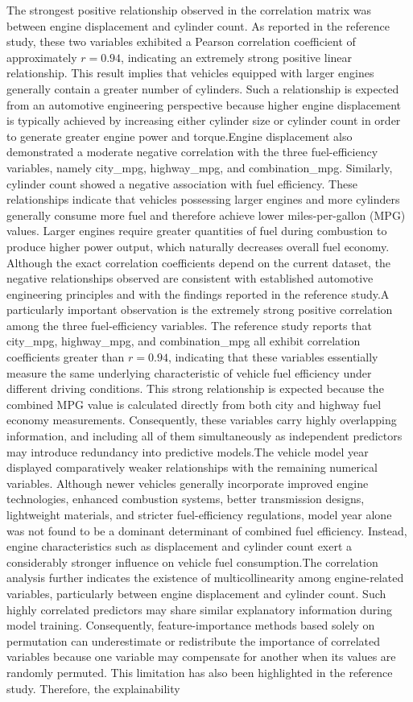 The strongest positive relationship observed in the correlation matrix was between engine displacement and cylinder count. As reported in the reference study, these two variables exhibited a Pearson correlation coefficient of approximately $r = 0.94$, indicating an extremely strong positive linear relationship. This result implies that vehicles equipped with larger engines generally contain a greater number of cylinders. Such a relationship is expected from an automotive engineering perspective because higher engine displacement is typically achieved by increasing either cylinder size or cylinder count in order to generate greater engine power and torque.Engine displacement also demonstrated a moderate negative correlation with the three fuel-efficiency variables, namely city\_mpg, highway\_mpg, and combination\_mpg. Similarly, cylinder count showed a negative association with fuel efficiency. These relationships indicate that vehicles possessing larger engines and more cylinders generally consume more fuel and therefore achieve lower miles-per-gallon (MPG) values. Larger engines require greater quantities of fuel during combustion to produce higher power output, which naturally decreases overall fuel economy. Although the exact correlation coefficients depend on the current dataset, the negative relationships observed are consistent with established automotive engineering principles and with the findings reported in the reference study.A particularly important observation is the extremely strong positive correlation among the three fuel-efficiency variables. The reference study reports that city\_mpg, highway\_mpg, and combination\_mpg all exhibit correlation coefficients greater than $r = 0.94$, indicating that these variables essentially measure the same underlying characteristic of vehicle fuel efficiency under different driving conditions. This strong relationship is expected because the combined MPG value is calculated directly from both city and highway fuel economy measurements. Consequently, these variables carry highly overlapping information, and including all of them simultaneously as independent predictors may introduce redundancy into predictive models.The vehicle model year displayed comparatively weaker relationships with the remaining numerical variables. Although newer vehicles generally incorporate improved engine technologies, enhanced combustion systems, better transmission designs, lightweight materials, and stricter fuel-efficiency regulations, model year alone was not found to be a dominant determinant of combined fuel efficiency. Instead, engine characteristics such as displacement and cylinder count exert a considerably stronger influence on vehicle fuel consumption.The correlation analysis further indicates the existence of multicollinearity among engine-related variables, particularly between engine displacement and cylinder count. Such highly correlated predictors may share similar explanatory information during model training. Consequently, feature-importance methods based solely on permutation can underestimate or redistribute the importance of correlated variables because one variable may compensate for another when its values are randomly permuted. This limitation has also been highlighted in the reference study. Therefore, the explainability 